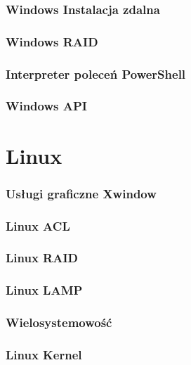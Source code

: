 \documentclass[a4paper,twoside]{article}
\begin{document}
	
	\section{Windows Instalacja zdalna}
	
	\section{Windows RAID}
	
	\section{Interpreter poleceń PowerShell}
	
	\section{Windows API}
	
\part{Linux}
	\section{Usługi graficzne Xwindow}
	
	\section{Linux ACL}
	
	\section{Linux RAID}
	
	\section{Linux LAMP}
	
	\section{Wielosystemowość}
	
	\section{Linux Kernel}
\end{document}
